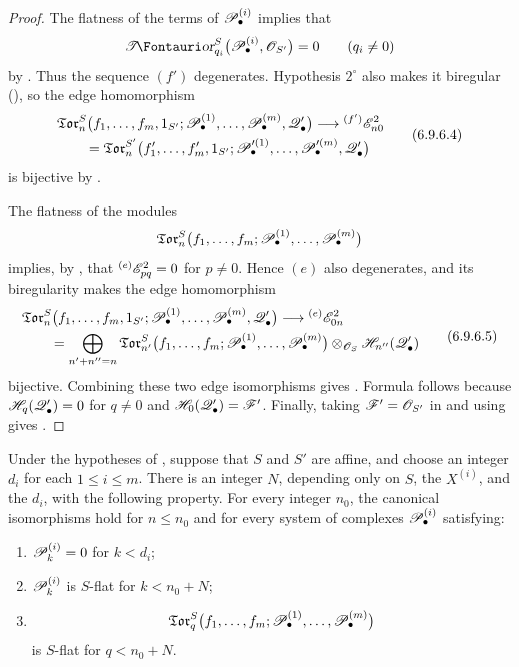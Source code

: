 \begin{proof}
The flatness of the terms of $\mathscr{P}_\bullet^{(i)}$ implies that
\[
  \shTor_{q_i}^S
  \bigl(
    \sh P_\bullet^{(i)},\sh O_{S'}
  \bigr)
  =
  0
  \qquad(q_i\neq0)
\]
by .  Thus the sequence $(f')$ degenerates.
Hypothesis $2^\circ$ also makes it biregular
(), so the edge homomorphism
\[
\begin{split}
  &
  \mathfrak{Tor}_n^S
  \bigl(
    f_1,\ldots,f_m,1_{S'};
    \mathscr{P}_\bullet^{(1)},\ldots,\mathscr{P}_\bullet^{(m)},
    \mathscr{Q}_\bullet'
  \bigr)
  \longrightarrow
  {}^{(f')}\mathscr{E}_{n0}^2
  \\
  &\qquad =
  \mathfrak{Tor}_n^{S'}
  \bigl(
    f_1',\ldots,f_m',1_{S'};
    \mathscr{P}_\bullet^{\prime(1)},\ldots,
    \mathscr{P}_\bullet^{\prime(m)},\mathscr{Q}_\bullet'
  \bigr)
\end{split}
  \tag{6.9.6.4}\label{III.6.9.6.4.eq}
\]
is bijective by .

The flatness of the modules
\[
  \mathfrak{Tor}_n^S
  \bigl(
    f_1,\ldots,f_m;
    \mathscr{P}_\bullet^{(1)},\ldots,\mathscr{P}_\bullet^{(m)}
  \bigr)
\]
implies, by , that
${}^{(e)}\mathscr{E}_{pq}^2=0$ for $p\neq0$.  Hence $(e)$ also
degenerates, and its biregularity makes the edge homomorphism
\[
\begin{split}
  &
  \mathfrak{Tor}_n^S
  \bigl(
    f_1,\ldots,f_m,1_{S'};
    \mathscr{P}_\bullet^{(1)},\ldots,\mathscr{P}_\bullet^{(m)},
    \mathscr{Q}_\bullet'
  \bigr)
  \longrightarrow
  {}^{(e)}\mathscr{E}_{0n}^2
  \\
  &\qquad =
  \bigoplus_{n'+n''=n}
  \mathfrak{Tor}_{n'}^S
  \bigl(
    f_1,\ldots,f_m;
    \mathscr{P}_\bullet^{(1)},\ldots,\mathscr{P}_\bullet^{(m)}
  \bigr)
  \otimes_{\mathscr{O}_S}
  \mathscr{H}_{n''}(\mathscr{Q}_\bullet')
\end{split}
  \tag{6.9.6.5}\label{III.6.9.6.5.eq}
\]
bijective.  Combining these two edge isomorphisms gives
.  Formula  follows because
$\mathscr{H}_q(\mathscr{Q}_\bullet')=0$ for $q\neq0$ and
$\mathscr{H}_0(\mathscr{Q}_\bullet')=\mathscr{F}'$.  Finally, taking
$\mathscr{F}'=\mathscr{O}_{S'}$ in  and using
 gives .
\end{proof}

\begin{corollary}[6.9.7]
\label{III.6.9.7}
Under the hypotheses of , suppose that $S$ and
$S'$ are affine, and choose an integer $d_i$ for each
$1\leq i\leq m$.  There is an integer $N$, depending only on $S$,
the $X^{(i)}$, and the $d_i$, with the following property.  For
every integer $n_0$, the canonical isomorphisms
 hold for $n\leq n_0$ and for every system of
complexes $\mathscr{P}_\bullet^{(i)}$ satisfying:
\begin{enumerate}
  \item[$1^\circ$] $\mathscr{P}_k^{(i)}=0$ for $k<d_i$;
  \item[$2^\circ$] $\mathscr{P}_k^{(i)}$ is $S$-flat for
  $k<n_0+N$;
  \item[$3^\circ$]
  \[
    \mathfrak{Tor}_q^S
    \bigl(
      f_1,\ldots,f_m;
      \mathscr{P}_\bullet^{(1)},\ldots,\mathscr{P}_\bullet^{(m)}
    \bigr)
  \]
  is $S$-flat for $q<n_0+N$.
\end{enumerate}
\end{corollary}

